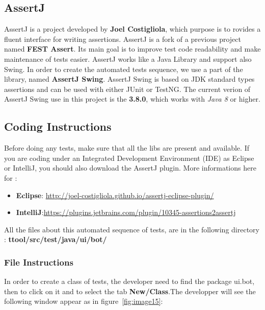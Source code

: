 \documentclass[12pt]{article}
\begin{document}
\subsection{AssertJ}
AssertJ is a project developed by \textbf{Joel Costigliola}, which purpose is to rovides a fluent interface for writing assertions. 
AssertJ is a fork of a previous project named \textbf{FEST Assert}. Its main goal is to improve test code readability and make maintenance of tests easier.
AssertJ works like a Java Library and support also Swing.\newline
In order to create the automated tests sequence, we use a part of the library, named \textbf{AssertJ Swing}.
AssertJ Swing is based on JDK standard types assertions and can be used with either JUnit or TestNG. \newline
The current verion of AssertJ Swing use in this project is the \textbf{3.8.0}, which works with \textit{Java 8} or higher.

\newpage

\subsection{Coding Instructions}
Before doing any tests, make sure that all the libs are present and available. \newline
If you are coding under an Integrated Development Environment (IDE) as Eclipse or IntelliJ, you should also download the AssertJ plugin. More informations here for :

\begin{itemize}
   \item \textbf{Eclipse}: \url{http://joel-costigliola.github.io/assertj-eclipse-plugin/}
   \item \textbf{IntelliJ}:\url{https://plugins.jetbrains.com/plugin/10345-assertions2assertj}
\end{itemize}

All the files about this automated sequence of tests, are in the following directory : \textbf{ttool/src/test/java/ui/bot/}

\subsubsection{File Instructions}
In order to create a class of tests, the developer need to find the package ui.bot, then to click on it and to select the tab \textbf{New/Class}.The developper will see the following window appear as in figure~\ref{fig:image15}:
\end{document}
